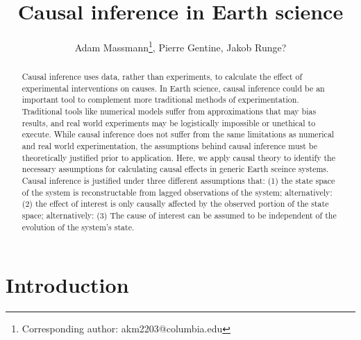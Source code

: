 \documentclass[12pt]{article}
\begin{document}
\title{Causal inference in Earth science}

\author{Adam Massmann\thanks{Corresponding author:
    akm2203@columbia.edu}, Pierre Gentine, Jakob Runge?}

\maketitle
\begin{abstract}
  Causal inference uses data, rather than experiments, to calculate
  the effect of experimental interventions on causes. In Earth
  science, causal inference could be an important tool to complement
  more traditional methods of experimentation. Traditional tools like
  numerical models suffer from approximations that may bias results,
  and real world experiments may be logistically impossible or
  unethical to execute. While causal inference does not suffer from
  the same limitations as numerical and real world experimentation,
  the assumptions behind causal inference must be theoretically
  justified prior to application. Here, we apply causal theory to
  identify the necessary assumptions for calculating causal effects in
  generic Earth sceince systems. Causal inference is justified under
  three different assumptions that: (1) the state space of the system
  is reconstructable from lagged observations of the system;
  alternatively: (2) the effect of interest is only causally affected
  by the observed portion of the state space; alternatively: (3) The
  cause of interest can be assumed to be independent of the evolution
  of the system’s state.
\end{abstract}

\section{Introduction}
\end{document}
